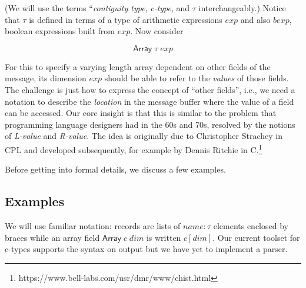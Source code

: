 \documentclass[svgnames]{llncs}
\newcommand{\ie}{i.e.}
\newcommand{\konst}[1]{\ensuremath{\mathsf{#1}}}
\begin{document}
(We will use the terms ``\emph{contiguity type}, \emph{c-type}, and $\tau$
interchangeably.) Notice that $\tau$ is defined in terms of a type of
arithmetic expressions $\mathit{exp}$ and also $\mathit{bexp}$,
boolean expressions built from $\mathit{exp}$. Now consider

\[
 \konst{Array} \; \tau \; \mathit{exp}
\]

\noindent For this to specify a varying length array dependent on
other fields of the message, its dimension $\mathit{exp}$ should be
able to refer to the \emph{values} of those fields. The challenge is
just how to express the concept of ``other fields'', \ie, we need a
notation to describe the \emph{location} in the message buffer where
the value of a field can be accessed. Our core insight is that this is
similar to the problem that programming language designers had in the
60s and 70s, resolved by the notions of \emph{L-value} and
\emph{R-value}. The idea is originally due to Christopher Strachey in
CPL and developed subsequently, for example by Dennis Ritchie in
C.\footnote{https://www.bell-labs.com/usr/dmr/www/chist.html}

\noindent Before getting into formal details, we discuss a few examples.

\subsection{Examples}

We will use familiar notation: records are lists of $\mathit{name} :
\tau$ elements enclosed by braces while an array field
$\konst{Array}\;c\;\mathit{dim}$ is written $c [\mathit{dim}]$. Our
current toolset for c-types supports the syntax on output but we have
yet to implement a parser.
\end{document}
